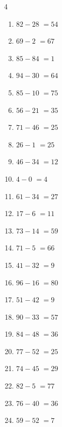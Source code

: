 \begin{multicols}{4}
\begin{enumerate}
\resetques

  \item $82-28$
        $=54$

  \item $69-2$
        $=67$

  \item $85-84$
        $=1$

  \item $94-30$
        $=64$

  \item $85-10$
        $=75$

  \item $56-21$
        $=35$

  \item $71-46$
        $=25$

  \item $26-1$
        $=25$

  \item $46-34$
        $=12$

  \item $4-0$
        $=4$

  \item $61-34$
        $=27$

  \item $17-6$
        $=11$

  \item $73-14$
        $=59$

  \item $71-5$
        $=66$

  \item $41-32$
        $=9$

  \item $96-16$
        $=80$

  \item $51-42$
        $=9$

  \item $90-33$
        $=57$

  \item $84-48$
        $=36$

  \item $77-52$
        $=25$

  \item $74-45$
        $=29$

  \item $82-5$
        $=77$

  \item $76-40$
        $=36$

  \item $59-52$
        $=7$


\end{enumerate}
\end{multicols}
